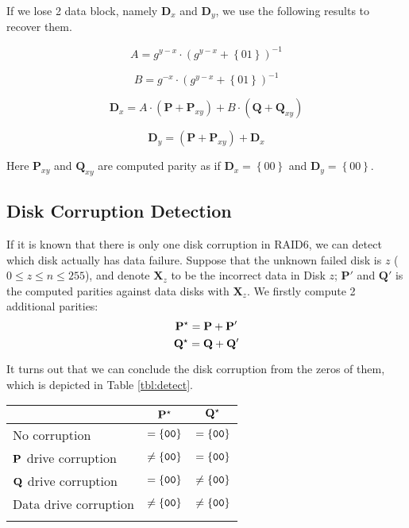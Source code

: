 If we lose 2 data block, namely $\mathbf{D}_x$ and $\mathbf{D}_y$, we use the following results to recover them.

\begin{equation}
	A = g^{y-x}\cdot (g^{y-x}+\left\{01\right\})^{-1}
\end{equation}

\begin{equation}
	B = g^{-x}\cdot(g^{y-x}+\left\{01\right\})^{-1}
\end{equation}

\begin{equation}
	\mathbf{D}_{x} = A\cdot (\mathbf{P}+\mathbf{P}_{xy}) + B\cdot (\mathbf{Q}+\mathbf{Q}_{xy})
\end{equation}

\begin{equation}
	\mathbf{D}_{y} = (\mathbf{P}+\mathbf{P}_{xy}) + \mathbf{D}_x
\end{equation}

Here $\mathbf{P}_{xy}$ and $\mathbf{Q}_{xy}$ are computed parity as if $\mathbf{D}_x=\left\{00\right\}$ and $\mathbf{D}_y=\left\{00\right\}$.


\subsection{Disk Corruption Detection}

If it is known that there is only one disk corruption in RAID6, we can detect which disk actually has data failure. Suppose that the unknown failed disk is $z$ ($0\leq z\leq n\leq 255$), and denote $\mathbf{X}_z$ to be the incorrect data in Disk $z$; $\mathbf{P}'$ and $\mathbf{Q}'$ is the computed parities against data disks with $\mathbf{X}_z$. We firstly compute 2 additional parities:
\begin{equation}
	\Pstar = \mathbf{P} + \mathbf{P}'
\end{equation}
\begin{equation}
	\Qstar = \mathbf{Q} + \mathbf{Q}'
\end{equation}

It turns out that we can conclude the disk corruption from the zeros of them, which is depicted in Table \ref{tbl:detect}.

\begin{center}
\def\tmp#1{\multicolumn{1}{|l|}{#1}}
\begin{tabular}{l|c|c|} \cline{2-3}
& $\Pstar$ & $\Qstar$ \\ \hline
\tmp{No corruption} & $= \g{00}$ & $= \g{00}$ \\ \hline
\tmp{$\P$ drive corruption} & $\not= \g{00}$ & $= \g{00}$ \\ \hline
\tmp{$\Q$ drive corruption} & $= \g{00}$ & $\not= \g{00}$ \\ \hline
\tmp{Data drive corruption} & $\not= \g{00}$ & $\not= \g{00}$ \\ \hline
\label{tbl:detect}
\end{tabular}
\end{center}

